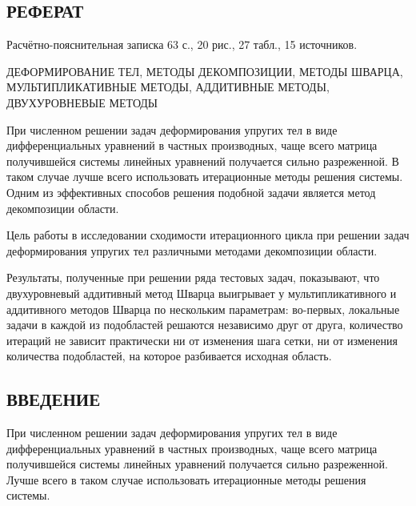 \documentclass[a4paper, 14pt]{extarticle}
\begin{document}
\newpage

\begin{center}
\section*{\centering РЕФЕРАТ}
\end{center}
\setcounter{page}{2}

Расчётно-пояснительная записка 63 с., 20 рис., 27 табл., 15 источников.

ДЕФОРМИРОВАНИЕ ТЕЛ, МЕТОДЫ ДЕКОМПОЗИЦИИ, МЕТОДЫ ШВАРЦА, МУЛЬТИПЛИКАТИВНЫЕ МЕТОДЫ, АДДИТИВНЫЕ МЕТОДЫ, ДВУХУРОВНЕВЫЕ МЕТОДЫ

При численном решении задач деформирования упругих тел в виде дифференциальных уравнений в частных производных, чаще всего матрица получившейся системы линейных уравнений получается сильно разреженной. В таком случае лучше всего использовать итерационные методы решения системы. Одним из эффективных способов решения подобной задачи является метод декомпозиции области.

Цель работы в исследовании сходимости итерационного цикла при решении задач деформирования упругих тел различными методами декомпозиции области.

Результаты, полученные при решении ряда тестовых задач, показывают, что двухуровневый аддитивный метод Шварца выигрывает у мультипликативного и аддитивного методов Шварца по нескольким параметрам: во-первых, локальные задачи в каждой из подобластей решаются независимо друг от друга, количество итераций не зависит практически ни от изменения шага сетки, ни от изменения количества подобластей, на которое разбивается исходная область.

\newpage

\renewcommand*\contentsname{\begin{center}СОДЕРЖАНИЕ\end{center}}
	
\tableofcontents

\newpage

\begin{center}
\section*{\centering ВВЕДЕНИЕ}
\end{center}

При численном решении задач деформирования упругих тел в виде дифференциальных уравнений в частных производных, чаще всего матрица получившейся системы линейных уравнений получается сильно разреженной. Лучше всего в таком случае использовать итерационные методы решения системы. 
\end{document}
